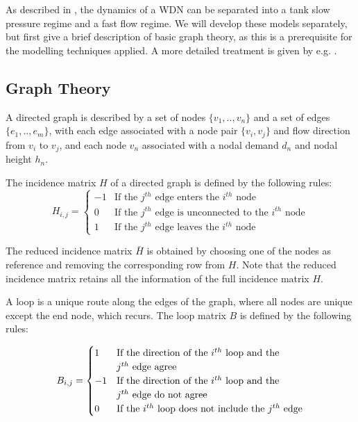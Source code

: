 As described in , the dynamics of a WDN can be separated into a tank slow pressure regime and a fast flow regime. We will develop these models separately, but first give a brief description of basic graph theory, as this is a prerequisite for the modelling techniques applied. A more detailed treatment is given by e.g. \cite{Deo}.

\subsection{Graph Theory}\label{subsec:GraphTheory}

A directed graph is described by a set of nodes $ \{v_1,..,v_n\} $ and a set of edges $ \{e_1,..,e_m\} $, with each edge associated with a node pair $ \{v_i,v_j\} $ and flow direction from $ v_i $ to $ v_j $, and each node $v_n$ associated with a nodal demand $d_n$ and nodal height $h_n$.

The incidence matrix $H$ of a directed graph is defined by the following rules:
\begin{equation*}
	H_{i,j} = \begin{cases}
		-1 & \text{If the $j^{th}$ edge enters the $i^{th}$ node} \\
		0 & \text{If the $j^{th}$ edge is unconnected to the $i^{th}$ node} \\
		1 & \text{If the $j^{th}$ edge leaves the $i^{th}$ node}
	\end{cases}
\end{equation*} %

The reduced incidence matrix $\bar{H}$ is obtained by choosing one of the nodes as reference and removing the corresponding row from $H$. Note that the reduced incidence matrix retains all the information of the full incidence matrix $H$.

A loop is a unique route along the edges of the graph, where all nodes are unique except the end node, which recurs. The loop matrix $B$ is defined by the following rules:

\begin{equation*}
	B_{i,j} = \begin{cases}
		1 & \text{If the direction of the $ i^{th} $ loop and the} \\& \text{$j^{th}$ edge agree}\\
		-1 & \text{If the direction of the $ i^{th} $ loop and the} \\& \text{$j^{th}$ edge do not agree}\\
		0 & \text{If the $ i^{th} $ loop does not include the $ j^{th} $ edge}\\
	\end{cases}
\end{equation*}

